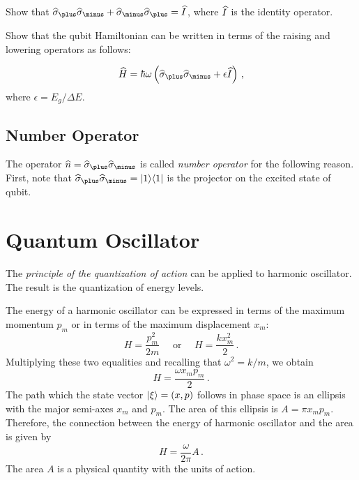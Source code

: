 \begin{exercise}
	Show that  $\op{\sigma}_\plus \op{\sigma}_\minus+\op{\sigma}_\minus \op{\sigma}_\plus=\op{I}$, where $\widehat{I}$ is the identity operator.
\end{exercise}

\begin{exercise}
	Show that the qubit Hamiltonian can be written in terms of the raising and lowering operators as follows:
	
	\[
	\op{H} = \hbar\omega\left(\op{\sigma}_\plus \op{\sigma}_\minus+\epsilon\op{I} \right)\,,
	\]
	where $\epsilon=E_g/\Delta E$.
\end{exercise}

\subsection{Number Operator}
The operator $\op{n}=\op{\sigma}_\plus \op{\sigma}_\minus$ is called \emph{number operator} for the following reason. First, note that $\op{\sigma}_\plus \op{\sigma}_\minus=\ketbra{1}{1}$ is the projector on the excited state of qubit.
 

\section{Quantum Oscillator}\label{sec:QuantumOscillator}
The \emph{principle of the quantization of action} can be applied to harmonic oscillator. The result is the quantization of energy levels. 

The energy of a harmonic oscillator can be expressed in terms of the maximum momentum $p_m$ or in terms of the maximum displacement $x_m$:
\[
H = \frac{p_m^2}{2m}\quad\textrm{ or }\quad H=\frac{kx_m^2}{2}\,.
\]
Multiplying these two equalities and recalling that $\omega^2=k/m$, we obtain
\[
H = \frac{\omega x_m p_m}{2}\,.
\]
The path which the state vector $|{\xi}\rangle=(x,p)$ follows in phase space is an ellipsis with the major semi-axes $x_m$ and $p_m$. The area of this ellipsis is $A=\pi x_m p_m$. Therefore, the connection between the energy of harmonic oscillator and the area is given by
\[
H=\frac{\omega}{2\pi}A\,.
\]
The area $A$ is a physical quantity with the units of action.

